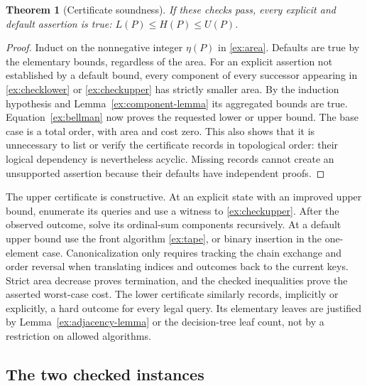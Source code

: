 \documentclass[11pt]{article}
\newtheorem{theorem}{Theorem}[section]
\theoremstyle{definition}
\theoremstyle{remark}
\begin{document}
\begin{theorem}[Certificate soundness]\label{ex:certificate-theorem}
If these checks pass, every explicit and default assertion is true:
$L(P)\le H(P)\le U(P)$.

\end{theorem}
\begin{proof}
Induct on the nonnegative integer $\eta(P)$ in \eqref{ex:area}.
Defaults are true by the elementary bounds, regardless of the area.
For an explicit assertion not established by a default bound, every component
of every successor appearing in \eqref{ex:checklower} or
\eqref{ex:checkupper} has strictly smaller area.  By the induction hypothesis
and Lemma~\ref{ex:component-lemma} its aggregated bounds are true.  Equation~\eqref{ex:bellman} now
proves the requested lower or upper bound.  The base case is a total order,
with area and cost zero.  This also shows that it is unnecessary to list or
verify the certificate records in topological order: their logical dependency
is nevertheless acyclic.  Missing records cannot create an unsupported
assertion because their defaults have independent proofs.
\end{proof}

The upper certificate is constructive.  At an explicit state with an improved
upper bound, enumerate its queries and use a witness to
\eqref{ex:checkupper}.  After the observed outcome, solve its ordinal-sum
components recursively.  At a default upper bound use the front algorithm
\eqref{ex:tape}, or binary insertion in the one-element case.  Canonicalization
only requires tracking the chain exchange and order reversal when translating
indices and outcomes back to the current keys.  Strict area decrease proves
termination, and the checked inequalities prove the asserted worst-case cost.
The lower certificate similarly records, implicitly or explicitly, a hard
outcome for every legal query.  Its elementary leaves are justified by
Lemma~\ref{ex:adjacency-lemma} or the decision-tree leaf count, not by a restriction on allowed
algorithms.

\subsection{The two checked instances}
\end{document}
